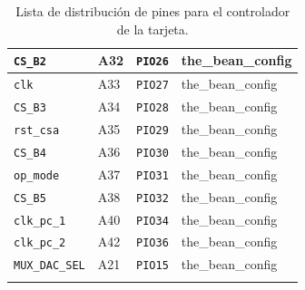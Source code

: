 \documentclass[11pt,letterpaper,spanish]{article}
\begin{document}
\begin{center}
\begin{longtable}{|l|l|l|l|}
\verb=CS_B2= &A32&\verb+PIO26+& the\_bean\_config \\\hline
\verb=clk= &A33&\verb+PIO27+& the\_bean\_config \\\hline
\verb=CS_B3= &A34&\verb+PIO28+& the\_bean\_config \\\hline
\verb=rst_csa= &A35&\verb+PIO29+& the\_bean\_config \\\hline
\verb=CS_B4= &A36&\verb+PIO30+& the\_bean\_config \\\hline
\verb=op_mode= &A37&\verb+PIO31+& the\_bean\_config \\\hline
\verb=CS_B5= &A38&\verb+PIO32+& the\_bean\_config \\\hline
\verb=clk_pc_1= &A40&\verb+PIO34+& the\_bean\_config \\\hline
\verb=clk_pc_2= &A42&\verb+PIO36+& the\_bean\_config \\\hline
\verb=MUX_DAC_SEL= &A21&\verb+PIO15+& the\_bean\_config \\\hline
\caption{\label{pinout2}Lista de distribución de pines para el controlador de la tarjeta.}
\end{longtable}
\end{center}
\end{document}
